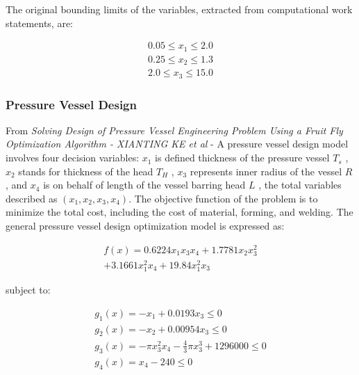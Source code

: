 \documentclass[conference]{IEEEtran}
\begin{document}
The original bounding limits of the variables, extracted from computational work
statements, are:

\begin{equation}
    \begin{split}
        0.05 \leq x_1 \leq 2.0\\
        0.25 \leq x_2 \leq 1.3\\
        2.0 \leq x_3 \leq 15.0
    \end{split}
\end{equation}

\subsubsection{Pressure Vessel Design}
\label{subsubsec:methodology-pressure-vessel-design}
From \textit{Solving Design of Pressure Vessel Engineering
Problem Using a Fruit Fly Optimization Algorithm - XIANTING KE et al} -
A pressure vessel design model involves four decision variables: $x_1$ is defined
thickness of the pressure vessel $T_s$ , $x_2$ stands for
thickness of the head $T_H$ , $x_3$ represents inner radius of the
vessel $R$ , and $x_4$ is on behalf of length of the vessel
barring head $L$ , the total variables described as $( x_1 , x_2 , x_3 , x_4 )$.
The objective function of the problem is to minimize the total cost, including
the cost of material, forming, and welding.
The general pressure vessel design optimization model is expressed as:

\begin{equation}
	\begin{split}
        f(x) = 0.6224 x_1 x_3 x_4 + 1.7781 x_2 x_3^2 \\
        + 3.1661 x_1^2 x_4 + 19.84 x_1^2 x_3
	\end{split}
\end{equation}

subject to:

\begin{equation}
    \begin{split}
        g_1(x) = - x_1 + 0.0193 x_3 \leq 0\\
        g_2(x) = - x_2 + 0.00954 x_3 \leq 0\\
        g_3(x) = - \pi x_3^2 x_4 -\frac{4}{3}\pi x_3^3 + 1296000 \leq 0\\
        g_4(x) = x_4 -240 \leq 0\\
    \end{split}
\end{equation}
\end{document}
